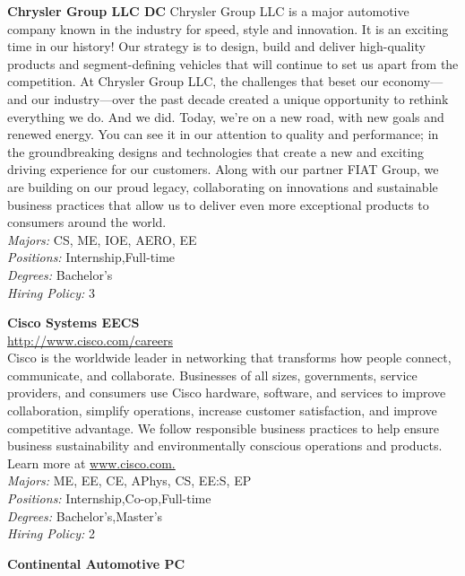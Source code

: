 \documentclass[twoside]{article}
\begin{document}
\begin{center}
\begin{multicols}{2}
\begin{minipage}{.95\columnwidth}{\Large\bf Chrysler Group LLC \hfill DC}
    Chrysler Group LLC is a major automotive company known in the industry for speed, style and innovation. It is an exciting time in our history! Our strategy is to design, build and deliver high-quality products and segment-defining vehicles that will continue to set us apart from the competition. At Chrysler Group LLC, the challenges that beset our economy—and our industry—over the past decade created a unique opportunity to rethink everything we do. And we did. Today, we’re on a new road, with new goals and renewed energy. You can see it in our attention to quality and performance; in the groundbreaking designs and technologies that create a new and exciting driving experience for our customers. Along with our partner FIAT Group, we are building on our proud legacy, collaborating on innovations and sustainable business practices that allow us to deliver even more exceptional products to consumers around the world.\\
    \emph{Majors:} CS, ME, IOE, AERO, EE\\
    \emph{Positions:} Internship,Full-time\\
    \emph{Degrees:} Bachelor's\\
    \emph{Hiring Policy:} 3\\
\end{minipage}
 \begin{minipage}{.95\columnwidth}{\Large\bf Cisco Systems \hfill EECS}\\
    \url{http://www.cisco.com/careers}\\
    Cisco is the worldwide leader in networking that transforms how people connect, communicate, and collaborate. Businesses of all sizes, governments, service providers, and consumers use Cisco hardware, software, and services to improve collaboration, simplify operations, increase customer satisfaction, and improve competitive advantage. We follow responsible business practices to help ensure business sustainability and environmentally conscious operations and products. Learn more at \url{www.cisco.com.}\\
    \emph{Majors:} ME, EE, CE, APhys, CS, EE:S, EP\\
    \emph{Positions:} Internship,Co-op,Full-time\\
    \emph{Degrees:} Bachelor's,Master's\\
    \emph{Hiring Policy:} 2\\
\end{minipage}
 \begin{minipage}{.95\columnwidth}{\Large\bf Continental Automotive \hfill PC}\\

\end{minipage}
\end{multicols}
\end{center}
\end{document}
